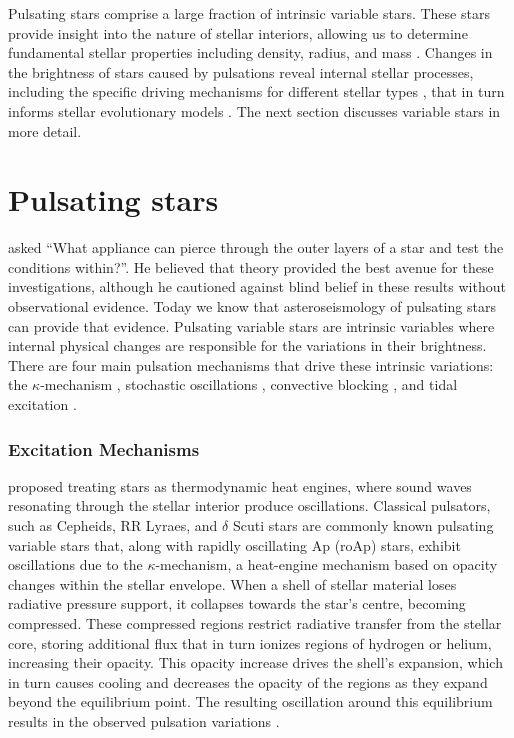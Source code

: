 Pulsating stars comprise a large fraction of intrinsic variable stars. These stars provide insight into the nature of stellar interiors, allowing us to determine fundamental stellar properties including density, radius, and mass \citep{chaplin_asteroseismic_2013, aerts_asteroseismology_2010, basu_asteroseismic_2017}. Changes in the brightness of stars caused by pulsations reveal internal stellar processes, including the specific driving mechanisms for different stellar types \cite[eg.][and references therein]{lenain_epsilon-mechanism_2006, welsh_koi-54_2011, aerts_asteroseismology_2010}, that in turn informs stellar evolutionary models \cite[eg.][]{garcia_observational_2015, houdek_surface_2017}. The next section discusses variable stars in more detail.

\section{Pulsating stars}

\cite{Eddington_internal_1926} asked ``What appliance can pierce through the outer layers of a star and test the conditions within?''. He believed that theory provided the best avenue for these investigations, although he cautioned against blind belief in these results without observational evidence. Today we know that asteroseismology of pulsating stars can provide that evidence. Pulsating variable stars are intrinsic variables where internal physical changes are responsible for the variations in their brightness. There are four main pulsation mechanisms that drive these intrinsic variations: the $\kappa$-mechanism \citep{eddington_cause_1941}, stochastic oscillations \citep{unno_stellar_1967}, convective blocking \citep{pesnell_new_1987}, and tidal excitation \citep{kumar_tidal_1995}.

\subsubsection{Excitation Mechanisms}

\cite{eddington_pulsation_1917} proposed treating stars as thermodynamic heat engines, where sound waves resonating through the stellar interior produce oscillations. Classical pulsators, such as Cepheids, RR Lyraes, and $\delta$ Scuti stars are commonly known pulsating variable stars that, along with rapidly oscillating Ap (roAp) stars, exhibit oscillations due to the $\kappa$-mechanism, a heat-engine mechanism based on opacity changes within the stellar envelope.  When a shell of stellar material loses radiative pressure support, it collapses towards the star's centre, becoming compressed. These compressed regions restrict radiative transfer from the stellar core, storing additional flux \citep{zhevakin_physical_1963} that in turn ionizes regions of hydrogen or helium, increasing their opacity. This opacity increase drives the shell's expansion, which in turn causes cooling and decreases the opacity of the regions as they expand beyond the equilibrium point. The resulting oscillation around this equilibrium results in the observed pulsation variations \citep{king_pulsating_1968}.

